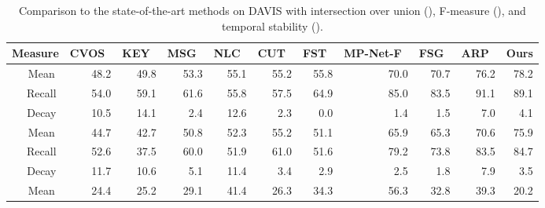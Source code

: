\begin{table*}[t]
\begin{center}
\begin{tabular}{l | c | rrrrrrrrrr}
\hline
\multicolumn{2}{c|}{Measure} & CVOS~\cite{taylor2015causal} & KEY~\cite{lee2011key} & MSG~\cite{brox2010object} & NLC~\cite{Faktor14} & CUT~\cite{keuper2015motion} & FST~\cite{papazoglou2013fast} & MP-Net-F~\cite{tokmakov2016learning} & FSG~\cite{jain2017fusionseg} & ARP~\cite{kohprimary} & Ours \\
\hline
\multirow{3}{*}{} & Mean   & 48.2 & 49.8 & 53.3 & 55.1 & 55.2 & 55.8 & 70.0 & 70.7 & 76.2 & 78.2  \\
& Recall  & 54.0 & 59.1 & 61.6  & 55.8 & 57.5 & 64.9 & 85.0 & 83.5 & 91.1 & 89.1  \\
& Decay & 10.5 & 14.1 & 2.4 & 12.6 & 2.3 & 0.0 & ~~1.4 & ~1.5 & 7.0 & 4.1  \\
\hline
\multirow{3}{*}{} & Mean   & 44.7 & 42.7 & 50.8 & 52.3 & 55.2 & 51.1 & 65.9 & 65.3 & 70.6 & 75.9  \\
& Recall   & 52.6 & 37.5 & 60.0 & 51.9 & 61.0 & 51.6 & 79.2 & 73.8 & 83.5 & 84.7  \\
& Decay   & 11.7 & 10.6 & 5.1 & 11.4 & 3.4 & 2.9 & ~~2.5 & ~~1.8 & 7.9 & 3.5  \\
\hline
 & Mean   & 24.4 & 25.2 & 29.1 & 41.4 & 26.3 & 34.3 & 56.3 & 32.8 & 39.3 & 20.2  \\
\hline
\end{tabular}
\caption{Comparison to the state-of-the-art methods on DAVIS with intersection
over union (), F-measure (), and temporal stability
().}
\label{tbl:soadavis}
\end{center}
\end{table*}

